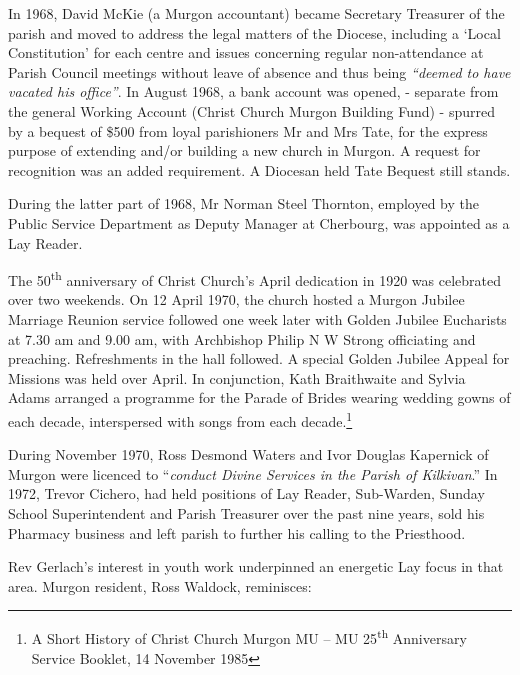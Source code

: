 In 1968, David McKie (a Murgon accountant) became Secretary Treasurer of the parish and moved to address the legal matters of the Diocese, including a `Local Constitution' for each centre and issues concerning regular non-attendance at Parish Council meetings without leave of absence and thus being \emph{``deemed to have vacated his office''}. In August 1968, a bank account was opened, - separate from the general Working Account (Christ Church Murgon Building Fund) - spurred by a bequest of \$500 from loyal parishioners Mr and Mrs Tate, for the express purpose of extending and/or building a new church in Murgon. A request for recognition was an added requirement. A Diocesan held Tate Bequest still stands.



During the latter part of 1968, Mr Norman Steel Thornton, employed by the Public Service Department as Deputy Manager at Cherbourg, was appointed as a Lay Reader.



The 50\textsuperscript{th} anniversary of Christ Church's April dedication in 1920 was celebrated over two weekends. On 12 April 1970, the church hosted a Murgon Jubilee Marriage Reunion service followed one week later with Golden Jubilee Eucharists at 7.30 am and 9.00 am, with Archbishop Philip N W Strong officiating and preaching. Refreshments in the hall followed. A special Golden Jubilee Appeal for Missions was held over April. In conjunction, Kath Braithwaite and Sylvia Adams arranged a programme for the Parade of Brides wearing wedding gowns of each decade, interspersed with songs from each decade.\footnote{A Short History of Christ Church Murgon MU -- MU 25\textsuperscript{th} Anniversary Service Booklet, 14 November 1985}


During November 1970, Ross Desmond Waters and Ivor Douglas Kapernick of Murgon were licenced to ``\emph{conduct Divine Services in the Parish of Kilkivan}.'' In 1972, Trevor Cichero, had held positions of Lay Reader, Sub-Warden, Sunday School Superintendent and Parish Treasurer over the past nine years, sold his Pharmacy business and left parish to further his calling to the Priesthood.



Rev Gerlach's interest in youth work underpinned an energetic Lay focus in that area. Murgon resident, Ross Waldock, reminisces:



